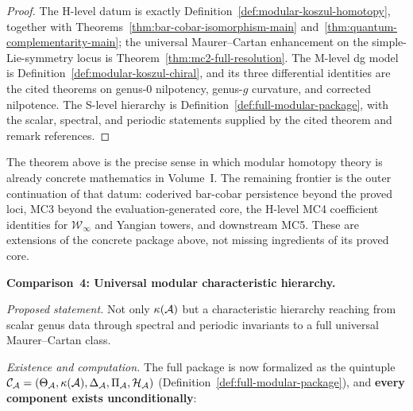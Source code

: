 \begin{proof}
The H-level datum is exactly
Definition~\ref{def:modular-koszul-homotopy}, together with
Theorems~\ref{thm:bar-cobar-isomorphism-main}
and~\ref{thm:quantum-complementarity-main}; the universal
Maurer--Cartan enhancement on the simple-Lie-symmetry locus is
Theorem~\ref{thm:mc2-full-resolution}.  The M-level dg model is
Definition~\ref{def:modular-koszul-chiral}, and its three
differential identities are the cited theorems on genus-$0$
nilpotency, genus-$g$ curvature, and corrected nilpotence.  The
S-level hierarchy is
Definition~\ref{def:full-modular-package}, with the scalar,
spectral, and periodic statements supplied by the cited theorem and
remark references.
\end{proof}

\begin{remark}
\label{rem:volume-one-concrete-modular-datum-frontier}
The theorem above is the precise sense in which modular homotopy
theory is already concrete mathematics in Volume~I.  The remaining
frontier is the outer continuation of that datum: coderived
bar-cobar persistence beyond the proved loci, MC3 beyond the
evaluation-generated core, the H-level MC4 coefficient identities for
$\mathcal{W}_\infty$ and Yangian towers, and downstream MC5.  These
are extensions of the concrete package above, not missing ingredients
of its proved core.
\end{remark}

\medskip

\noindent\textbf{Comparison~4: Universal modular characteristic hierarchy.}

\emph{Proposed statement.}
Not only $\kappa(\mathcal{A})$ but a characteristic hierarchy reaching from
scalar genus data through spectral and periodic invariants to a full
universal Maurer--Cartan class.

\emph{Existence and computation.}
The full package is now formalized as the quintuple
$\mathcal{C}_{\mathcal{A}} = (\Theta_{\mathcal{A}}, \kappa(\mathcal{A}), \Delta_{\mathcal{A}},
\Pi_{\mathcal{A}}, \mathcal{H}_{\mathcal{A}})$
(Definition~\ref{def:full-modular-package}), and \textbf{every
component exists unconditionally}:

